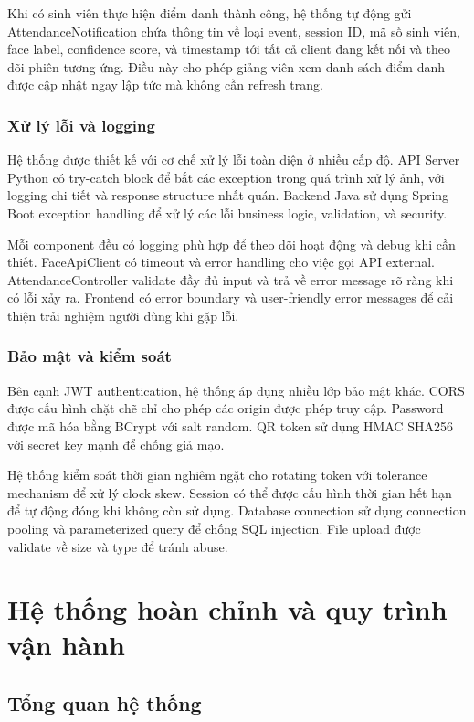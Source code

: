 \documentclass[12pt,a4paper]{report}
\begin{document}
Khi có sinh viên thực hiện điểm danh thành công, hệ thống tự động gửi AttendanceNotification chứa thông tin về loại event, session ID, mã số sinh viên, face label, confidence score, và timestamp tới tất cả client đang kết nối và theo dõi phiên tương ứng. Điều này cho phép giảng viên xem danh sách điểm danh được cập nhật ngay lập tức mà không cần refresh trang.

\subsection{Xử lý lỗi và logging}
Hệ thống được thiết kế với cơ chế xử lý lỗi toàn diện ở nhiều cấp độ. API Server Python có try-catch block để bắt các exception trong quá trình xử lý ảnh, với logging chi tiết và response structure nhất quán. Backend Java sử dụng Spring Boot exception handling để xử lý các lỗi business logic, validation, và security.

Mỗi component đều có logging phù hợp để theo dõi hoạt động và debug khi cần thiết. FaceApiClient có timeout và error handling cho việc gọi API external. AttendanceController validate đầy đủ input và trả về error message rõ ràng khi có lỗi xảy ra. Frontend có error boundary và user-friendly error messages để cải thiện trải nghiệm người dùng khi gặp lỗi.

\subsection{Bảo mật và kiểm soát}
Bên cạnh JWT authentication, hệ thống áp dụng nhiều lớp bảo mật khác. CORS được cấu hình chặt chẽ chỉ cho phép các origin được phép truy cập. Password được mã hóa bằng BCrypt với salt random. QR token sử dụng HMAC SHA256 với secret key mạnh để chống giả mạo.

Hệ thống kiểm soát thời gian nghiêm ngặt cho rotating token với tolerance mechanism để xử lý clock skew. Session có thể được cấu hình thời gian hết hạn để tự động đóng khi không còn sử dụng. Database connection sử dụng connection pooling và parameterized query để chống SQL injection. File upload được validate về size và type để tránh abuse.

\chapter{Hệ thống hoàn chỉnh và quy trình vận hành}
\section{Tổng quan hệ thống}
\end{document}
